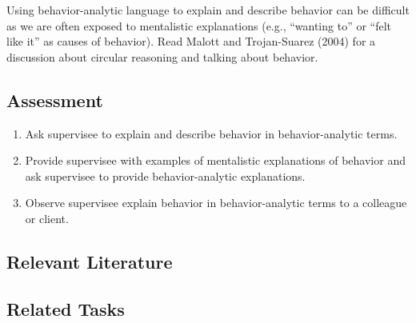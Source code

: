 Using behavior-analytic language to explain and describe behavior can be difficult as we are often exposed to mentalistic explanations (e.g., ``wanting to'' or ``felt like it'' as causes of behavior).  Read Malott and Trojan-Suarez (2004) for a discussion about circular reasoning and talking about behavior.

\subsection{Assessment}
\begin{enumerate}
\item Ask supervisee to explain and describe behavior in behavior-analytic terms.
\item Provide supervisee with examples of mentalistic explanations of behavior and ask supervisee to provide behavior-analytic explanations.
\item Observe supervisee explain behavior in behavior-analytic terms to a colleague or client.
%
\end{enumerate}
%
\subsection{Relevant Literature}
\begin{refsection}
\nocite{cooper2007applied,
        malott2008principles,
        moore2008conceptual}
\printbibliography[heading=none]
\end{refsection}
%
\subsection{Related Tasks}
\fourFKSeven{}\\
\fourFKEight{}\\
\fourFKThirtyOne{}\\
\fourFKThirtyThree{}\\
\fourgFour{}\\
\fouriOne{}\\
\fouriTwo{}\\
